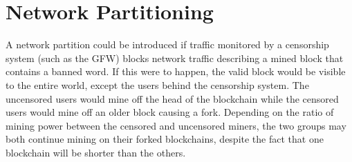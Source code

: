 \section{Network Partitioning} %
A network partition could be introduced if traffic monitored by a censorship system (such as the GFW) blocks network traffic describing a mined block that contains a banned word.
If this were to happen, the valid block would be visible to the entire world, except the users behind the censorship system. The uncensored users would mine off the head of the blockchain while the censored users would mine off an older block causing a fork.
Depending on the ratio of mining power between the censored and uncensored miners, the two groups may both continue mining on their forked blockchains, despite the fact that one blockchain will be shorter than the others.


